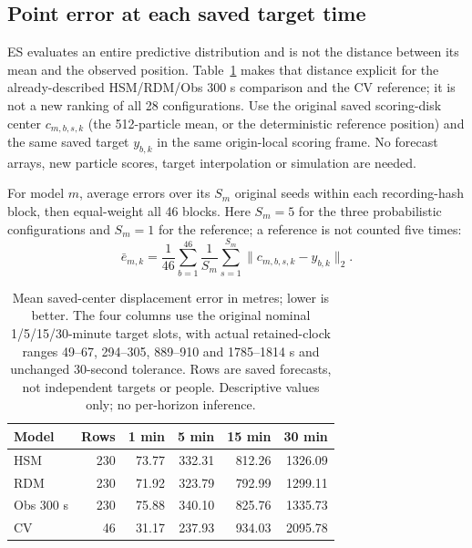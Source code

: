 \FloatBarrier
\subsection{Point error at each saved target time}
\label{sec:point-error-horizons}
ES evaluates an entire predictive distribution and is not the distance between its mean and the observed position. Table~\ref{tab:point-error-horizons} makes that distance explicit for the already-described HSM/RDM/Obs 300 s comparison and the CV reference; it is not a new ranking of all 28 configurations. Use the original saved scoring-disk center $c_{m,b,s,k}$ (the 512-particle mean, or the deterministic reference position) and the same saved target $y_{b,k}$ in the same origin-local scoring frame. No forecast arrays, new particle scores, target interpolation or simulation are needed.

For model $m$, average errors over its $S_m$ original seeds within each recording-hash block, then equal-weight all 46 blocks. Here $S_m=5$ for the three probabilistic configurations and $S_m=1$ for the reference; a reference is not counted five times:
\begin{equation}
\bar e_{m,k}=\frac{1}{46}\sum_{b=1}^{46}
\frac{1}{S_m}\sum_{s=1}^{S_m}\lVert c_{m,b,s,k}-y_{b,k}\rVert_2.
\label{eq:point-error-horizon-mean}
\end{equation}

\begin{table}[htbp]\centering\small
\caption{Mean saved-center displacement error in metres; lower is better. The four columns use the original nominal 1/5/15/30-minute target slots, with actual retained-clock ranges 49--67, 294--305, 889--910 and 1785--1814 s and unchanged 30-second tolerance. Rows are saved forecasts, not independent targets or people. Descriptive values only; no per-horizon inference.}\label{tab:point-error-horizons}
\begin{tabular}{@{}lrrrrr@{}}\toprule
Model & Rows & 1 min & 5 min & 15 min & 30 min\\\midrule
HSM & 230 & 73.77 & 332.31 & 812.26 & 1326.09\\
RDM & 230 & 71.92 & 323.79 & 792.99 & 1299.11\\
Obs 300 s & 230 & 75.88 & 340.10 & 825.76 & 1335.73\\
CV & 46 & 31.17 & 237.93 & 934.03 & 2095.78\\
\bottomrule\end{tabular}\end{table}


